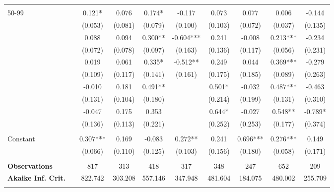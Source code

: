 \begin{tabular*}{\linewidth}{@{\extracolsep{\fill} } llcccccccc}
&&&&&&&&&\\%
\multirow{2}{*}{\hspace{0.2cm}50{-}99}&&0.121*&0.076&0.174*&{-}0.117&0.073&0.077&0.006&{-}0.144\\%
&&(0.053)&(0.081)&(0.079)&(0.100)&(0.103)&(0.072)&(0.037)&(0.135)\\%
\arrayrulecolor{white}%
\hline%
\arrayrulecolor{white}%
\hline%
\arrayrulecolor{white}%
\hline%
\arrayrulecolor{white}%
\hline%
\arrayrulecolor{white}%
\hline%
\multirow{2}{*}{\hspace{0.2cm}100{-}199}&&0.088&0.094&0.300**&{-}0.604***&0.241&{-}0.008&0.213***&{-}0.234\\%
&&(0.072)&(0.078)&(0.097)&(0.163)&(0.136)&(0.117)&(0.056)&(0.231)\\%
\arrayrulecolor{white}%
\hline%
\arrayrulecolor{white}%
\hline%
\arrayrulecolor{white}%
\hline%
\arrayrulecolor{white}%
\hline%
\arrayrulecolor{white}%
\hline%
\multirow{2}{*}{\hspace{0.2cm}200{-}299}&&0.019&0.061&0.335*&{-}0.512**&0.249&0.044&0.369***&{-}0.279\\%
&&(0.109)&(0.117)&(0.141)&(0.161)&(0.175)&(0.185)&(0.089)&(0.263)\\%
\arrayrulecolor{white}%
\hline%
\arrayrulecolor{white}%
\hline%
\arrayrulecolor{white}%
\hline%
\arrayrulecolor{white}%
\hline%
\arrayrulecolor{white}%
\hline%
\multirow{2}{*}{\hspace{0.2cm}300{-}399}&&{-}0.010&0.181&0.491**&&0.501*&{-}0.032&0.487***&{-}0.463\\%
&&(0.131)&(0.104)&(0.180)&&(0.214)&(0.199)&(0.131)&(0.310)\\%
\arrayrulecolor{white}%
\hline%
\arrayrulecolor{white}%
\hline%
\arrayrulecolor{white}%
\hline%
\arrayrulecolor{white}%
\hline%
\arrayrulecolor{white}%
\hline%
\multirow{2}{*}{\hspace{0.2cm}400+}&&{-}0.047&0.175&0.353&&0.644*&{-}0.027&0.548**&{-}0.789*\\%
&&(0.136)&(0.113)&(0.221)&&(0.252)&(0.253)&(0.177)&(0.374)\\%
\arrayrulecolor{white}%
\hline%
\arrayrulecolor{white}%
\hline%
\arrayrulecolor{white}%
\hline%
\arrayrulecolor{white}%
\hline%
\arrayrulecolor{white}%
\hline%
&&&&&&&&&\\%
\multirow{2}{*}{Constant}&&0.307***&0.169&{-}0.083&0.272**&0.241&0.696***&0.276***&0.149\\%
&&(0.066)&(0.110)&(0.125)&(0.103)&(0.156)&(0.180)&(0.058)&(0.171)\\%
\arrayrulecolor{white}%
\hline%
\arrayrulecolor{white}%
\hline%
\arrayrulecolor{white}%
\hline%
\arrayrulecolor{white}%
\hline%
\arrayrulecolor{white}%
\hline%
&&&&&&&&&\\%
\bfseries Observations&&817&313&418&317&348&247&652&209\\%
\bfseries Akaike Inf. Crit.&&822.742&303.208&557.146&347.948&481.604&184.075&480.002&255.709\\%
\arrayrulecolor{white}%
\hline%
\arrayrulecolor{white}%
\hline%
\arrayrulecolor{white}%
\hline%
\arrayrulecolor{white}%
\hline%
\arrayrulecolor{white}%
\hline%
\arrayrulecolor{black}%
\hline%
\end{tabular*}